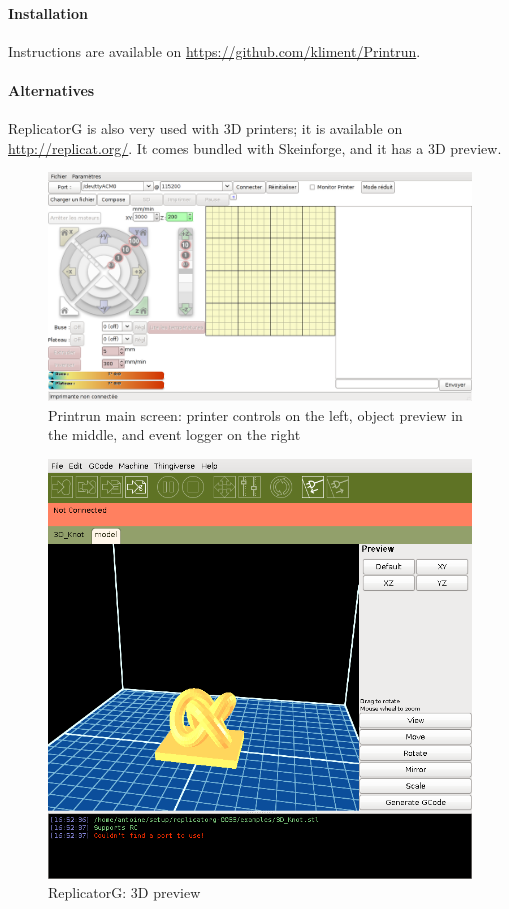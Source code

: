 \documentclass{article}
\begin{document}
	\paragraph{Installation} Instructions are available on \url{https://github.com/kliment/Printrun}.

	\paragraph{Alternatives} ReplicatorG is also very used with 3D printers; it is available on \url{http://replicat.org/}. It comes bundled with Skeinforge, and it has a 3D preview.

	\begin{figure}[h!]
		\centering
		\includegraphics[width=0.7\linewidth]{printrun.png}
		\caption{Printrun main screen: printer controls on the left, object preview in the middle, and event logger on the right}
	\end{figure}

	\begin{figure}[h!]
		\centering
		\includegraphics[width=0.5\linewidth]{replicatorg.png}
		\caption{ReplicatorG: 3D preview}
	\end{figure}
\end{document}
